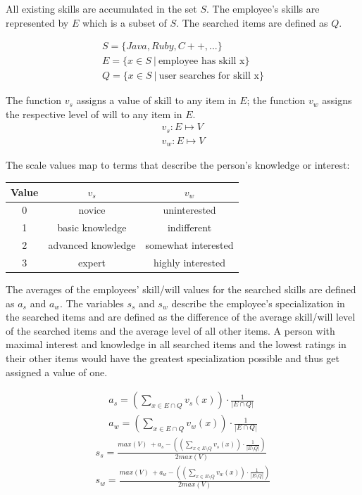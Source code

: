 All existing skills are accumulated in the set $S$. The employee's skills are represented by $E$ which is a subset of $S$. The searched items are
defined as $Q$.

\begin{gather*}
  S = \{Java, Ruby, C++, ...\} \\
  E = \{x \in S \ | \ \textrm{employee has skill x}\} \\
  Q = \{x \in S \ | \ \textrm{user searches for skill x}\}
\end{gather*}

The function $v_s$ assigns a value of skill to any item in $E$; the function $v_w$ assigns the respective level of will to any item in $E$.
\begin{gather*}
  v_s: E \mapsto V \\
  v_w: E \mapsto V
\end{gather*}

The scale values map to terms that describe the person's knowledge or interest:
\begin{center}
\begin{tabular}{c|c|c}
	Value & $v_s$ & $v_w$ \\
	\hline
	0 & novice & uninterested\\
	1 & basic knowledge & indifferent\\
	2 & advanced knowledge & somewhat interested\\
	3 & expert & highly interested\\
\end{tabular}
\end{center}

\newpage

The averages of the employees' skill/will values for the searched skills are defined as $a_s$ and $a_w$.
The variables $s_s$ and $s_w$ describe the employee's specialization in the searched items and are defined as the difference
of the average skill/will level of the searched items and the average level of all other items.
A person with maximal interest and knowledge in all searched items and the lowest ratings in their other items would have the greatest specialization possible and thus get assigned a value of one.

\begin{gather*}
  a_s = \left( \sum_{x \in E \cap Q} v_s(x) \right) \cdot \frac{1}{|E \cap Q|} \\
  a_w = \left( \sum_{x \in E \cap Q} v_w(x) \right) \cdot \frac{1}{|E \cap Q|}
\end{gather*}
\begin{gather*}
  s_s = \frac{max(V) \ + a_s - \left( \left( \sum_{x \in E \setminus Q} v_s(x)\right) \cdot \frac{1}{|E \setminus Q|} \right)}{2 max(V)}\\
  s_w = \frac{max(V) \ + a_w - \left( \left( \sum_{x \in E \setminus Q} v_w(x)\right) \cdot \frac{1}{|E \setminus Q|} \right)}{2 max(V)}
\end{gather*}

